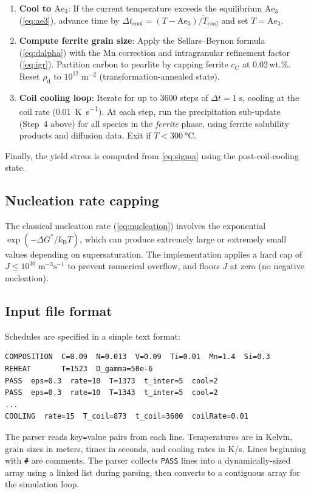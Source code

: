 \documentclass[11pt,a4paper]{article}
\newcommand{\rhod}{\ensuremath{\rho_\mathrm{d}}}
\newcommand{\Ae}{\ensuremath{\mathrm{Ae}_3}}
\begin{document}
\begin{enumerate}
  \item \textbf{Cool to $\Ae$}: If the current temperature exceeds the
    equilibrium $\Ae$ (\cref{eq:ae3}), advance time by
    $\Delta t_\mathrm{cool} = (T - \Ae)/\dot{T}_\mathrm{cool}$ and set
    $T = \Ae$.

  \item \textbf{Compute ferrite grain size}: Apply the Sellars--Beynon
    formula (\cref{eq:dalpha}) with the Mn correction and intragranular
    refinement factor (\cref{eq:igr}).  Partition carbon to pearlite by
    capping ferrite $c_\mathrm{C}$ at 0.02\,wt.\%.  Reset $\rhod$ to
    $10^{12}\;\mathrm{m}^{-2}$ (transformation-annealed state).

  \item \textbf{Coil cooling loop}: Iterate for up to 3600 steps of
    $\Delta t = 1\;\mathrm{s}$, cooling at the coil rate
    (\SI{0.01}{\kelvin\per\second}).  At each step, run the precipitation
    sub-update (Step~4 above) for all species in the \emph{ferrite} phase,
    using ferrite solubility products and diffusion data.  Exit if
    $T < \SI{300}{\degreeCelsius}$.
\end{enumerate}

\noindent Finally, the yield stress is computed from \cref{eq:sigma} using the
post-coil-cooling state.

\subsection{Nucleation rate capping}

The classical nucleation rate (\cref{eq:nucleation}) involves the exponential
$\exp(-\Delta G^*/k_\mathrm{B}T)$, which can produce extremely large or
extremely small values depending on supersaturation.  The implementation
applies a hard cap of $J \le 10^{30}\;\mathrm{m}^{-3}\mathrm{s}^{-1}$ to
prevent numerical overflow, and floors $J$ at zero (no negative nucleation).

\subsection{Input file format}

Schedules are specified in a simple text format:
\begin{verbatim}
COMPOSITION  C=0.09  N=0.013  V=0.09  Ti=0.01  Mn=1.4  Si=0.3
REHEAT       T=1523  D_gamma=50e-6
PASS  eps=0.3  rate=10  T=1373  t_inter=5  cool=2
PASS  eps=0.3  rate=10  T=1343  t_inter=5  cool=2
...
COOLING  rate=15  T_coil=873  t_coil=3600  coilRate=0.01
\end{verbatim}
The parser reads key\texttt{=}value pairs from each line.  Temperatures are
in Kelvin, grain sizes in meters, times in seconds, and cooling rates in
K/s.  Lines beginning with \texttt{\#} are comments.  The parser collects
\texttt{PASS} lines into a dynamically-sized array using a linked list
during parsing, then converts to a contiguous array for the simulation loop.
\end{document}
